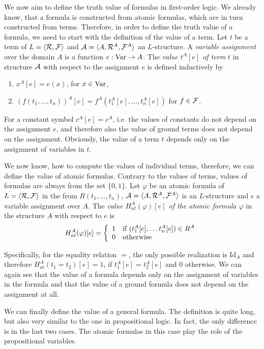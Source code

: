 We now aim to define the truth value of formulas in first-order logic. We already know, that a formula is constructed from atomic formulas, which are in turn constructed from terms. Therefore, in order to define the truth value of a formula, we need to start with the definition of the value of a term. Let $t$ be a term of $L = \langle \mathcal{R}, \mathcal{F} \rangle$ and $\mathcal{A} = \langle A, \mathcal{R}^A, \mathcal{F}^A \rangle$ an $L$-structure. A \emph{variable assignment} over the domain $A$ is a function $e: \operatorname{Var} \to A$. The \emph{value $t^A[e]$ of term $t$} in structure $\mathcal{A}$ with respect to the assignment $e$ is defined inductively by 
\begin{enumerate}
	\item $x^A[e] = e(x)$, for $x \in \operatorname{Var}$,
	\item $(f(t_1, \dots, t_n))^A[e] = f^A(t_1^A[e], \dots, t_n^A[e])$ for $f \in \mathcal{F}$.
\end{enumerate}
For a constant symbol $c^A[e] = c^A$, i.e. the values of constants do not depend on the assignment $e$, and therefore also the value of ground terms does not depend on the assignment. Obviously, the value of a term $t$ depends only on the assignment of variables in $t$.

We now know, how to compute the values of individual terms, therefore, we can define the value of atomic formulas. Contrary to the values of terms, values of formulas are always from the set $\{0,1\}$. Let $\varphi$ be an atomic formula of $L = \langle \mathcal{R}, \mathcal{F} \rangle$ in the from $R(t_1, \dots, t_n)$, $\mathcal{A} = \langle A, \mathcal{R}^A, \mathcal{F}^A \rangle$ is an $L$-structure and $e$ a variable assignment over $A$. The \emph{value $H^A_{at}(\varphi)[e]$ of the atomic formula $\varphi$} in the structure $A$ with respect to $e$ is $$H^A_{at}(\varphi)[e] = \left\{ \begin{array}{ll} 1 & \text{if } (t_1^A[e], \dots t_n^A[e]) \in R^A \\ 0 & \text{otherwise} \end{array} \right.$$

Specifically, for the equality relation $=$, the only possible realization is $\mathrm{Id}_A$ and therefore $H^A_{at}(t_1=t_2)[e] = 1$, if $t_1^A[e]=t_2^A[e]$ and $0$ otherwise. We can again see that the value of a formula depends only on the assignment of variables in the formula and that the value of a ground formula does not depend on the assignment at all.

We can finally define the value of a general formula. The definition is quite long, but also very similar to the one in propositional logic. In fact, the only difference is in the last two cases. The atomic formulas in this case play the role of the propositional variables.

